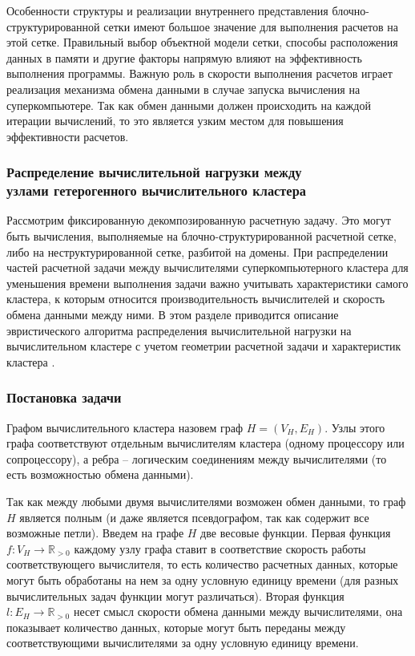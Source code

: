 Особенности структуры и реализации внутреннего представления блочно-структурированной сетки имеют большое значение для выполнения расчетов на этой сетке.
Правильный выбор объектной модели сетки, способы расположения данных в памяти и другие факторы напрямую влияют на эффективность выполнения программы.
Важную роль в скорости выполнения расчетов играет реализация механизма обмена данными в случае запуска вычисления на суперкомпьютере.
Так как обмен данными должен происходить на каждой итерации вычислений, то это является узким местом для повышения эффективности расчетов.

\subsubsection{Распределение вычислительной нагрузки между \\ узлами гетерогенного вычислительного кластера}\label{sec:text_2_getero}

\label{term:cluster_getero}Рассмотрим фиксированную декомпозированную расчетную задачу.
Это могут быть вычисления, выполняемые на блочно-структурированной расчетной сетке, либо на неструктурированной сетке, разбитой на домены.
При распределении частей расчетной задачи между вычислителями суперкомпьютерного кластера для уменьшения времени выполнения задачи важно учитывать характеристики самого кластера, к которым относится производительность вычислителей и скорость обмена данными между ними.
В этом разделе приводится описание эвристического алгоритма распределения вычислительной нагрузки на вычислительном кластере с учетом геометрии расчетной задачи и характеристик кластера \cite{Rybakov2018Distr,Rybakov2017Part}.

\subsubsection{Постановка задачи}

\begin{definition}
Графом вычислительного кластера\label{term:graph_cluster} назовем граф $H = (V_H, E_H)$.
Узлы этого графа соответствуют отдельным вычислителям кластера (одному процессору или сопроцессору), а ребра -- логическим соединениям между вычислителями (то есть возможностью обмена данными).
\end{definition}

Так как между любыми двумя вычислителями возможен обмен данными, то граф $H$ является полным (и даже является псевдографом, так как содержит все возможные петли).
Введем на графе $H$ две весовые функции.
Первая функция $f: V_H \rightarrow \mathbb{R}_{> 0}$ каждому узлу графа ставит в соответствие скорость работы соответствующего вычислителя, то есть количество расчетных данных, которые могут быть обработаны на нем за одну условную единицу времени (для разных вычислительных задач функции могут различаться).
Вторая функция $l: E_H \rightarrow \mathbb{R}_{> 0}$ несет смысл скорости обмена данными между вычислителями, она показывает количество данных, которые могут быть переданы между соответствующими вычислителями за одну условную единицу времени.

